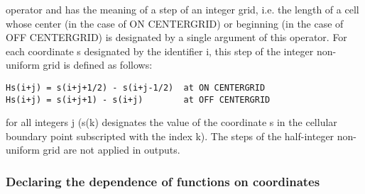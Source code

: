 operator and has the  meaning of  a step  of an  integer grid,  i.e. the
length  of  a  cell  whose  center  (in  the  case  of ON CENTERGRID) or
beginning (in the case of OFF  CENTERGRID)  is  designated  by  a single
argument  of  this  operator.  For  each  coordinate s designated by the
identifier i, this step of the  integer non-uniform  grid is  defined as
follows:
\begin{verbatim}
Hs(i+j) = s(i+j+1/2) - s(i+j-1/2)  at ON CENTERGRID
Hs(i+j) = s(i+j+1) - s(i+j)        at OFF CENTERGRID
\end{verbatim}
for all integers j (s(k) designates the value of the coordinate s in the
cellular boundary point subscripted with the index k). The steps  of the
half-integer non-uniform grid are not applied in outputs.


\subsubsection{Declaring the dependence of functions on coordinates}


